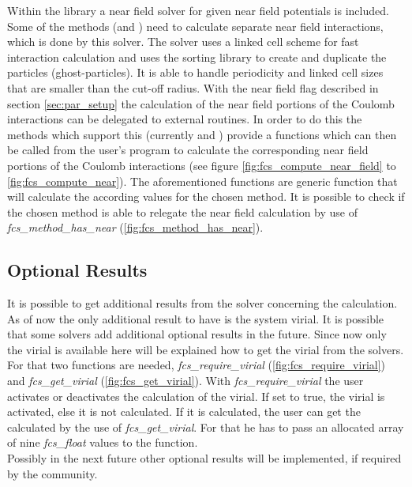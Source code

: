 Within the library a near field solver for given near field potentials is included. Some of the methods (\ptwonfft and \pthreem) need to calculate separate near field
interactions, which is done by this solver. The solver uses a linked cell scheme for fast interaction calculation and uses the sorting library to create and
duplicate the particles (ghost-particles). It is able to handle periodicity and linked cell sizes that are smaller than the cut-off radius. With the near field
flag described in section \ref{sec:par_setup} the calculation of the near field portions of the Coulomb interactions can be delegated to external routines.
In order to do this the methods which support this (currently \pthreem and \ptwonfft) provide a functions which can then be called from the user's program to calculate the
corresponding near field portions of the Coulomb interactions (see figure \ref{fig:fcs_compute_near_field} to \ref{fig:fcs_compute_near}). The aforementioned
functions are generic function that will calculate the according values for the chosen method. It is possible to check if the chosen method is able to relegate
the near field calculation by use of \textit{fcs\_method\_has\_near} (\ref{fig:fcs_method_has_near}).

\subsection{Optional Results}

It is possible to get additional results from the solver concerning the calculation. As of now the only additional result to have is the system virial. It is
possible that some solvers add additional optional results in the future. Since now only the virial is available here will be explained how to get the virial
from the solvers. For that two functions are needed, \textit{fcs\_require\_virial} (\ref{fig:fcs_require_virial}) and \textit{fcs\_get\_virial} (\ref{fig:fcs_get_virial}).
With \textit{fcs\_require\_virial} the user activates or deactivates the calculation of the virial. If set to true, the virial is activated, else it is not
calculated. If it is calculated, the user can get the calculated by the use of \textit{fcs\_get\_virial}. For that he has to pass an allocated array of nine
\textit{fcs\_float} values to the function.\\
Possibly in the next future other optional results will be implemented, if required by the community.

